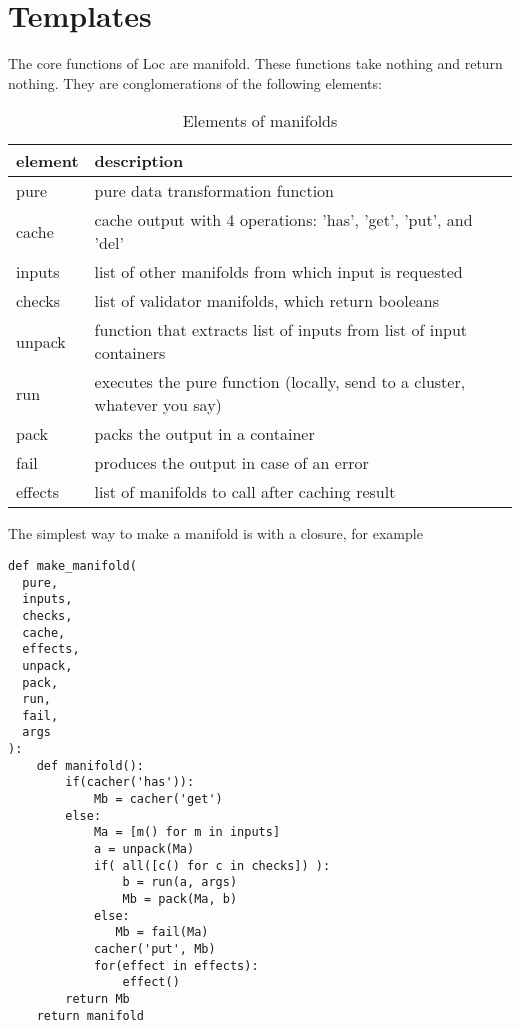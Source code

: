 \documentclass[12pt]{article}
\begin{document}
\section{Templates}

The core functions of Loc are manifold. These functions take nothing and return
nothing. They are conglomerations of the following elements:

\begin{table}[htpb]
  \centering
  \caption{Elements of manifolds}
  \label{tab:elements_of_manifolds}
  \begin{tabular}{l|l}
element & description \\
\hline
pure    & pure data transformation function                                         \\
cache   & cache output with 4 operations: 'has', 'get', 'put', and 'del'            \\
inputs  & list of other manifolds from which input is requested                     \\
checks  & list of validator manifolds, which return booleans                        \\
unpack  & function that extracts list of inputs from list of input containers       \\
run     & executes the pure function (locally, send to a cluster, whatever you say) \\
pack    & packs the output in a container                                           \\
fail    & produces the output in case of an error                                   \\
effects & list of manifolds to call after caching result
  \end{tabular}
\end{table}

The simplest way to make a manifold is with a closure, for example

\begin{verbatim}
def make_manifold(
  pure,
  inputs,
  checks,
  cache,
  effects,
  unpack,
  pack,
  run,
  fail,
  args
):
    def manifold():
        if(cacher('has')):
            Mb = cacher('get')
        else:
            Ma = [m() for m in inputs]
            a = unpack(Ma)
            if( all([c() for c in checks]) ):
                b = run(a, args)
                Mb = pack(Ma, b)
            else:
               Mb = fail(Ma)
            cacher('put', Mb)
            for(effect in effects):
                effect()
        return Mb
    return manifold
\end{verbatim}
\end{document}
